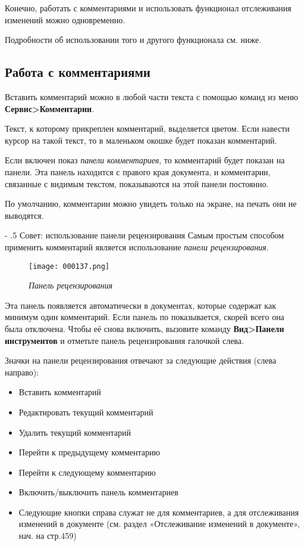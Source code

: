 ﻿\documentclass[a4paper,10pt]{article}
\makeatletter
\renewcommand\paragraph{%
   \@startsection{paragraph}{4}{0mm}%
      {-\baselineskip}%
      {.5\baselineskip}%
      {\normalfont\normalsize\bfseries}}
\makeatother
\begin{document}
 Конечно, работать с комментариями и использовать функционал отслеживания изменений можно одновременно.
 
 Подробности об использовании того и другого функционала см. ниже.
 
\subsection{Работа с комментариями}
Вставить комментарий можно в любой части текста с помощью команд из меню \textbf{Сервис>Комментарии}.

Текст, к которому прикреплен комментарий, выделяется цветом. Если навести курсор на такой текст, то в маленьком окошке будет показан комментарий.

Если включен показ \textit{панели комментариев}, то комментарий будет показан на панели. Эта панель находится с правого края документа, и комментарии, связанные с видимым текстом, показываются на этой панели постоянно.

По умолчанию, комментарии можно увидеть только на экране, на печать они не выводятся.

\paragraph{Совет: использование панели рецензирования}
Самым простым способом применить комментарий является использование \textit{панели рецензирования}.

\begin{figure}[ht]
\texttt{[image: 000137.png]}
\centering
\caption{\textit{Панель рецензирования}}
\end{figure}

Эта панель появляется автоматически в документах, которые содержат как минимум один комментарий. Если панель по показывается, скорей всего она была отключена. Чтобы её снова включить, вызовите команду \textbf{Вид>Панели инструментов} и отметьте панель рецензирования галочкой слева.

Значки на панели рецензирования отвечают за следующие действия (слева направо):
\begin{itemize}
 \item Вставить комментарий
 \item Редактировать текущий комментарий
 \item Удалить текущий комментарий
 \item Перейти к предыдущему комментарию
 \item Перейти к следующему комментарию
 \item Включить/выключить панель комментариев
 \newline
 \item Следующие кнопки справа служат не для комментариев, а для отслеживания изменений в документе (см. раздел «Отслеживание изменений в документе», нач. на стр.459)
\end{itemize}
\end{document}
